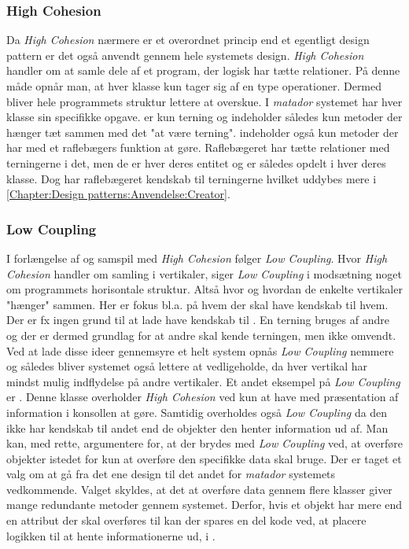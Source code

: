 \subsubsection{High Cohesion}\label{Chapter:Design patterns:Anvendelse:High Cohesion}
Da \textit{High Cohesion} nærmere er et overordnet princip end et egentligt design pattern er det også anvendt gennem hele systemets design. \textit{High Cohesion} handler om at samle dele af et program, der logisk har tætte relationer. På denne måde opnår man, at hver klasse kun tager sig af en type operationer. Dermed bliver hele programmets struktur lettere at overskue. I \textit{matador} systemet har hver klasse sin specifikke opgave.  er kun terning og indeholder således kun metoder der hænger tæt sammen med det "at være terning".  indeholder også kun metoder der har med et raflebægers funktion at gøre. Raflebægeret har tætte relationer med terningerne i det, men de er hver deres entitet og er således opdelt i hver deres klasse. Dog har raflebægeret kendskab til terningerne hvilket uddybes mere i \vref{Chapter:Design patterns:Anvendelse:Creator}.       

\subsubsection{Low Coupling}\label{Chapter:Design patterns:Anvendelse:Low Coupling}
I forlængelse af og samspil med \textit{High Cohesion} følger \textit{Low Coupling}. Hvor \textit{High Cohesion} handler om samling i vertikaler, siger \textit{Low Coupling} i modsætning noget om programmets horisontale struktur. Altså hvor og hvordan de enkelte vertikaler "hænger" sammen. Her er fokus bl.a. på hvem der skal have kendskab til hvem. Der er fx ingen grund til at lade  have kendskab til . En terning bruges af andre og der er dermed grundlag for at andre skal kende terningen, men ikke omvendt. Ved at lade disse ideer gennemsyre et helt system opnås \textit{Low Coupling} nemmere og således bliver systemet også lettere at vedligeholde, da hver vertikal har mindst mulig indflydelse på andre vertikaler. Et andet eksempel på \textit{Low Coupling} er . Denne klasse overholder \textit{High Cohesion} ved kun at have med præsentation af information i konsollen at gøre. Samtidig overholdes også \textit{Low Coupling} da den ikke har kendskab til andet end de objekter den henter information ud af. Man kan, med rette, argumentere for, at der brydes med \textit{Low Coupling} ved, at overføre objekter istedet for kun at overføre den specifikke data  skal bruge. Der er taget et valg om at gå fra det ene design til det andet for \textit{matador} systemets vedkommende. Valget skyldes, at det at overføre data gennem flere klasser giver mange redundante metoder gennem systemet. Derfor, hvis et objekt har mere end en attribut der skal overføres til  kan der spares en del kode ved, at placere logikken til at hente informationerne ud, i .   


